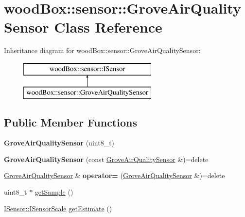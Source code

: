 \hypertarget{classwood_box_1_1sensor_1_1_grove_air_quality_sensor}{}\section{wood\+Box\+:\+:sensor\+:\+:Grove\+Air\+Quality\+Sensor Class Reference}
\label{classwood_box_1_1sensor_1_1_grove_air_quality_sensor}
Inheritance diagram for wood\+Box\+:\+:sensor\+:\+:Grove\+Air\+Quality\+Sensor\+:\begin{figure}[H]
\begin{center}
\leavevmode
\includegraphics[height=2.000000cm]{classwood_box_1_1sensor_1_1_grove_air_quality_sensor}
\end{center}
\end{figure}
\subsection*{Public Member Functions}
\begin{DoxyCompactItemize}
\item 
\mbox{\label{classwood_box_1_1sensor_1_1_grove_air_quality_sensor_a76692aa26d0f1debc9314faf97f3622e}} 
{\bfseries Grove\+Air\+Quality\+Sensor} (uint8\+\_\+t)
\item 
\mbox{\label{classwood_box_1_1sensor_1_1_grove_air_quality_sensor_a06fcdbf2e5709b1a7936169b72c5963d}} 
{\bfseries Grove\+Air\+Quality\+Sensor} (const \mbox{\hyperlink{classwood_box_1_1sensor_1_1_grove_air_quality_sensor}{Grove\+Air\+Quality\+Sensor}} \&)=delete
\item 
\mbox{\label{classwood_box_1_1sensor_1_1_grove_air_quality_sensor_a27e012b8973e48a28276957656fc444c}} 
\mbox{\hyperlink{classwood_box_1_1sensor_1_1_grove_air_quality_sensor}{Grove\+Air\+Quality\+Sensor}} \& {\bfseries operator=} (\mbox{\hyperlink{classwood_box_1_1sensor_1_1_grove_air_quality_sensor}{Grove\+Air\+Quality\+Sensor}} \&)=delete
\item 
uint8\+\_\+t $\ast$ \mbox{\hyperlink{classwood_box_1_1sensor_1_1_grove_air_quality_sensor_a204d677110c9fe3c6b495bf9112e9afd}{get\+Sample}} ()
\item 
\mbox{\hyperlink{classwood_box_1_1sensor_1_1_i_sensor_aa377bda61ed0d4a1d7e1a7bffe459452}{I\+Sensor\+::\+I\+Sensor\+Scale}} \mbox{\hyperlink{classwood_box_1_1sensor_1_1_grove_air_quality_sensor_a457e99f530b79f14db1de00cba3e81ff}{get\+Estimate}} ()
\end{DoxyCompactItemize}

